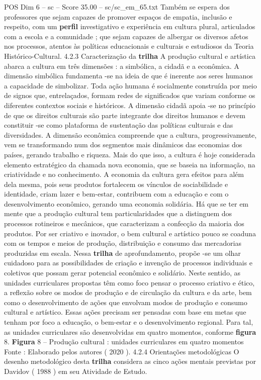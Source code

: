 \begin{textsample}{POS Dim 6 – sc – Score 35.00 – sc/sc\_em\_65.txt}
Também se espera dos professores que sejam capazes de promover espaços de empatia, inclusão e respeito, com um \textbf{perfil} investigativo e experiência em cultura plural, articulados com a escola e a comunidade ; que sejam capazes de albergar os diversos afetos nos processos, atentos às políticas educacionais e culturais e estudiosos da Teoria Histórico-Cultural. 4.2.3 Caracterização da \textbf{trilha} A produção cultural e artística abarca a cultura em três dimensões : a simbólica, a cidadã e a econômica.
A dimensão simbólica fundamenta -se na ideia de que é inerente aos seres humanos a capacidade de simbolizar.
Toda ação humana é socialmente construída por meio de signos que, entrelaçados, formam redes de significados que variam conforme os diferentes contextos sociais e históricos.
A dimensão cidadã apoia -se no princípio de que os direitos culturais são parte integrante dos direitos humanos e devem constituir -se como plataforma de sustentação das políticas culturais e das diversidades.
A dimensão econômica compreende que a cultura, progressivamente, vem se transformando num dos segmentos mais dinâmicos das economias dos países, gerando trabalho e riqueza.
Mais do que isso, a cultura é hoje considerada elemento estratégico da chamada nova economia, que se baseia na informação, na criatividade e no conhecimento.
A economia da cultura gera efeitos para além dela mesma, pois seus produtos fortalecem os vínculos de sociabilidade e identidade, criam lazer e bem-estar, contribuem com a educação e com o desenvolvimento econômico, gerando uma economia solidária.
Há que se ter em mente que a produção cultural tem particularidades que a distinguem dos processos rotineiros e mecânicos, que caracterizam a confecção da maioria dos produtos.
Por ser criativo e inovador, o bem cultural e artístico pouco se coaduna com os tempos e meios de produção, distribuição e consumo das mercadorias produzidas em escala.
Nessa \textbf{trilha} de aprofundamento, propõe -se um olhar cuidadoso para as possibilidades de criação e invenção de processos individuais e coletivos que possam gerar potencial econômico e solidário.
Neste sentido, as unidades curriculares propostas têm como foco pensar o processo criativo e ético, a reflexão sobre os modos de produção e de circulação da cultura e da arte, bem como o desenvolvimento de ações que envolvam modos de produção e consumo cultural e artístico.
Essas ações precisam ser pensadas com base em metas que tenham por foco a educação, o bem-estar e o desenvolvimento regional.
Para tal, as unidades curriculares são desenvolvidas em quatro momentos, conforme \textbf{figura} 8. \textbf{Figura} 8 – Produção cultural : unidades curriculares em quatro momentos Fonte : Elaborado pelos autores ( 2020 ). 4.2.4 Orientações metodológicas O desenho metodológico desta \textbf{trilha} considera as cinco ações mentais previstas por Davidov ( 1988 ) em seu Atividade de Estudo.

\end{textsample}
